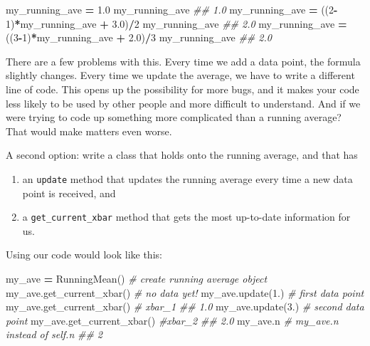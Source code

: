\documentclass[
  12pt,
  krantz2]{krantz}
\makeatletter
\newenvironment{Shaded}{\begin{snugshade}}{\end{snugshade}}
\newcommand{\CommentTok}[1]{\textcolor[rgb]{0.37,0.37,0.37}{\textit{#1}}}
\newcommand{\DecValTok}[1]{\textcolor[rgb]{0.06,0.06,0.06}{#1}}
\newcommand{\FloatTok}[1]{\textcolor[rgb]{0.06,0.06,0.06}{#1}}
\newcommand{\NormalTok}[1]{#1}
\newcommand{\OperatorTok}[1]{\textcolor[rgb]{0.43,0.43,0.43}{\textbf{#1}}}
\providecommand{\tightlist}{%
  \setlength{\itemsep}{0pt}\setlength{\parskip}{0pt}}
\newenvironment{kframe}{%
\medskip{}
\setlength{\fboxsep}{.8em}
 \def\at@end@of@kframe{}%
 \ifinner\ifhmode%
  \def\at@end@of@kframe{\end{minipage}}%
  \begin{minipage}{\columnwidth}%
 \fi\fi%
 \def\FrameCommand##1{\hskip\@totalleftmargin \hskip-\fboxsep
 \colorbox{shadecolor}{##1}\hskip-\fboxsep
     \hskip-\linewidth \hskip-\@totalleftmargin \hskip\columnwidth}%
 \MakeFramed {\advance\hsize-\width
   \@totalleftmargin\z@ \linewidth\hsize
   \@setminipage}}%
 {\par\unskip\endMakeFramed%
 \at@end@of@kframe}
\renewenvironment{Shaded}{\begin{kframe}}{\end{kframe}}
\makeatother
\begin{document}
\begin{Shaded}
\begin{Highlighting}[]
\NormalTok{my\_running\_ave }\OperatorTok{=} \FloatTok{1.0}
\NormalTok{my\_running\_ave}
\CommentTok{\#\# 1.0}
\NormalTok{my\_running\_ave }\OperatorTok{=}\NormalTok{ ((}\DecValTok{2}\OperatorTok{{-}}\DecValTok{1}\NormalTok{)}\OperatorTok{*}\NormalTok{my\_running\_ave }\OperatorTok{+} \FloatTok{3.0}\NormalTok{)}\OperatorTok{/}\DecValTok{2}
\NormalTok{my\_running\_ave}
\CommentTok{\#\# 2.0}
\NormalTok{my\_running\_ave }\OperatorTok{=}\NormalTok{ ((}\DecValTok{3}\OperatorTok{{-}}\DecValTok{1}\NormalTok{)}\OperatorTok{*}\NormalTok{my\_running\_ave }\OperatorTok{+} \FloatTok{2.0}\NormalTok{)}\OperatorTok{/}\DecValTok{3}
\NormalTok{my\_running\_ave}
\CommentTok{\#\# 2.0}
\end{Highlighting}
\end{Shaded}

There are a few problems with this. Every time we add a data point, the formula slightly changes. Every time we update the average, we have to write a different line of code. This opens up the possibility for more bugs, and it makes your code less likely to be used by other people and more difficult to understand. And if we were trying to code up something more complicated than a running average? That would make matters even worse.

A second option: write a class that holds onto the running average, and that has

\begin{enumerate}
\def\labelenumi{\arabic{enumi}.}
\tightlist
\item
  an \texttt{update} method that updates the running average every time a new data point is received, and
\item
  a \texttt{get\_current\_xbar} method that gets the most up-to-date information for us.
\end{enumerate}

Using our code would look like this:

\begin{Shaded}
\begin{Highlighting}[]
\NormalTok{my\_ave }\OperatorTok{=}\NormalTok{ RunningMean() }\CommentTok{\# create running average object}
\NormalTok{my\_ave.get\_current\_xbar() }\CommentTok{\# no data yet!}
\NormalTok{my\_ave.update(}\FloatTok{1.}\NormalTok{) }\CommentTok{\# first data point}
\NormalTok{my\_ave.get\_current\_xbar() }\CommentTok{\# xbar\_1}
\CommentTok{\#\# 1.0}
\NormalTok{my\_ave.update(}\FloatTok{3.}\NormalTok{)  }\CommentTok{\# second data point}
\NormalTok{my\_ave.get\_current\_xbar()  }\CommentTok{\#xbar\_2}
\CommentTok{\#\# 2.0}
\NormalTok{my\_ave.n   }\CommentTok{\# my\_ave.n instead of self.n}
\CommentTok{\#\# 2}
\end{Highlighting}
\end{Shaded}
\end{document}
